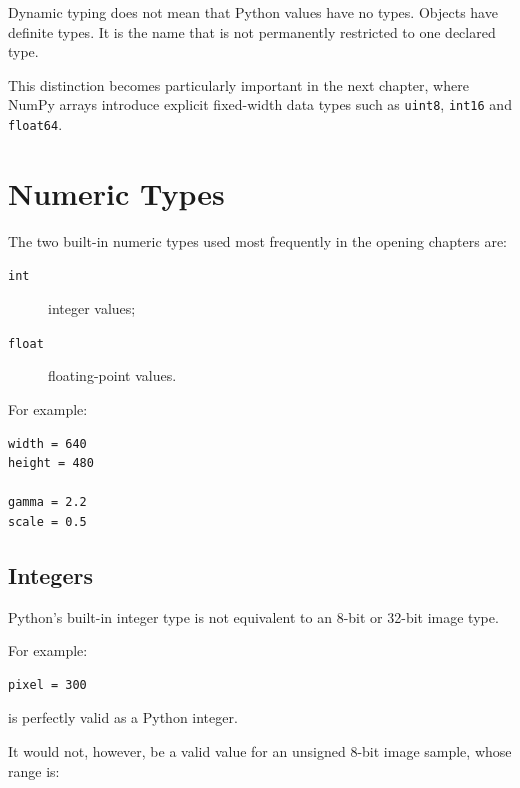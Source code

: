 \begin{implementationnote}
Dynamic typing does not mean that Python values have no types.
Objects have definite types. It is the name that is not permanently
restricted to one declared type.

This distinction becomes particularly important in the next chapter,
where NumPy arrays introduce explicit fixed-width data types such as
\texttt{uint8}, \texttt{int16} and \texttt{float64}.
\end{implementationnote}


\section{Numeric Types}
\label{sec:python-numeric-types}

The two built-in numeric types used most frequently in the opening
chapters are:

\begin{description}

    \item[\texttt{int}]
    integer values;

    \item[\texttt{float}]
    floating-point values.

\end{description}

For example:

\begin{verbatim}
width = 640
height = 480

gamma = 2.2
scale = 0.5
\end{verbatim}


\subsection{Integers}

Python's built-in integer type is not equivalent to an 8-bit or
32-bit image type.

For example:

\begin{verbatim}
pixel = 300
\end{verbatim}

is perfectly valid as a Python integer.

It would not, however, be a valid value for an unsigned 8-bit image
sample, whose range is:


